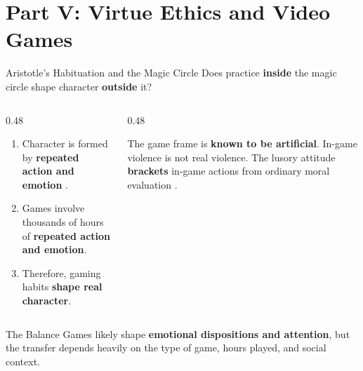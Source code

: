 \documentclass[aspectratio=169,11pt]{beamer}
\begin{document}
\section{Part V: Virtue Ethics and Video Games}

\begin{frame}[t]{Aristotle's Habituation and the Magic Circle}
\footnotesize
Does practice \textbf{inside} the magic circle shape character \textbf{outside} it?

\vspace{0.12cm}
\begin{columns}[T]
\begin{column}{0.48\textwidth}
\begin{argumentbox}
\footnotesize
\begin{enumerate}
    \item Character is formed by \textbf{repeated action and emotion} \parencite{aristotle_nicomachean}.
    \item Games involve thousands of hours of \textbf{repeated action and emotion}.
    \item Therefore, gaming habits \textbf{shape real character}.
\end{enumerate}
\end{argumentbox}
\end{column}
\begin{column}{0.48\textwidth}
\begin{objectionbox}
\footnotesize
The game frame is \textbf{known to be artificial}. In-game violence is not real violence. The lusory attitude \textbf{brackets} in-game actions from ordinary moral evaluation \parencite{ferguson_video_game_debate}.
\end{objectionbox}
\end{column}
\end{columns}

\vspace{0.1cm}
\begin{alertblock}{The Balance}
\scriptsize
Games likely shape \textbf{emotional dispositions and attention}, but the transfer depends heavily on the type of game, hours played, and social context.
\end{alertblock}
\end{frame}
\end{document}
